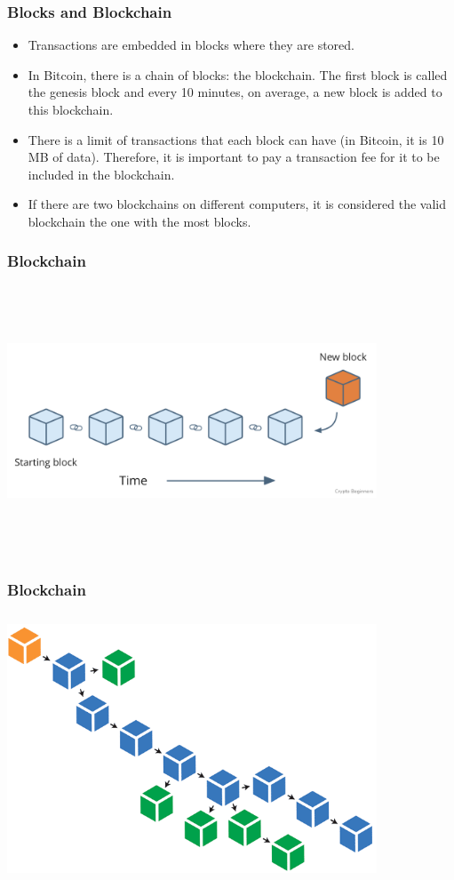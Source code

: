 \documentclass{beamer}
\begin{document}
\begin{frame}
   \frametitle{Blocks and Blockchain}
   \begin{itemize}
     \item Transactions are embedded in blocks where they are stored.
     \item In Bitcoin, there is a chain of blocks: the blockchain.
       The first block is called the genesis block and every 10 minutes, on average, a new block is added to this blockchain.
     \item There is a limit of transactions that each block can have (in Bitcoin, it is 10 MB of data).
       Therefore, it is important to pay a transaction fee for it to be included in the blockchain.
     \item If there are two blockchains on different computers, it is considered the valid blockchain the one with the most blocks.
   \end{itemize}
\end{frame}

\begin{frame}
\frametitle{Blockchain}
\includegraphics[width=11cm, height=8cm]{blockchain1}
\end{frame}

\begin{frame}
\frametitle{Blockchain}
\includegraphics[width=11cm, height=8cm]{blockchain2}
\end{frame}
\end{document}
